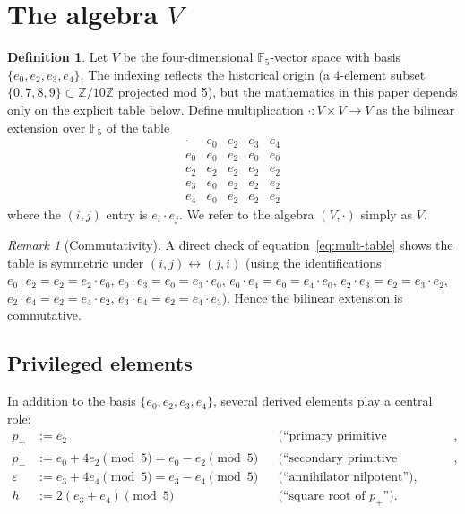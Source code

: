 \documentclass[11pt,reqno]{amsart}
\theoremstyle{plain}
\theoremstyle{definition}
\newtheorem{definition}[theorem]{Definition}
\theoremstyle{remark}
\newtheorem*{remark}{Remark}
\newcommand{\Z}{\mathbb{Z}}
\newcommand{\F}{\mathbb{F}}
\begin{document}
\section{The algebra $V$}
\label{sec:V}

\begin{definition}\label{def:V}
Let $V$ be the four-dimensional $\F_5$-vector space with basis $\{e_0, e_2, e_3, e_4\}$. The indexing reflects the historical origin (a 4-element subset $\{0, 7, 8, 9\} \subset \Z/10\Z$ projected mod 5), but the mathematics in this paper depends only on the explicit table below. Define multiplication $\cdot: V \times V \to V$ as the bilinear extension over $\F_5$ of the table
\begin{equation}\label{eq:mult-table}
\begin{array}{c|cccc}
\cdot & e_0 & e_2 & e_3 & e_4 \\ \hline
e_0 & e_0 & e_2 & e_0 & e_0 \\
e_2 & e_2 & e_2 & e_2 & e_2 \\
e_3 & e_0 & e_2 & e_2 & e_2 \\
e_4 & e_0 & e_2 & e_2 & e_2
\end{array}
\end{equation}
where the $(i, j)$ entry is $e_i \cdot e_j$. We refer to the algebra $(V, \cdot)$ simply as $V$.
\end{definition}

\begin{remark}[Commutativity]
A direct check of equation~\eqref{eq:mult-table} shows the table is symmetric under $(i, j) \leftrightarrow (j, i)$ (using the identifications $e_0 \cdot e_2 = e_2 = e_2 \cdot e_0$, $e_0 \cdot e_3 = e_0 = e_3 \cdot e_0$, $e_0 \cdot e_4 = e_0 = e_4 \cdot e_0$, $e_2 \cdot e_3 = e_2 = e_3 \cdot e_2$, $e_2 \cdot e_4 = e_2 = e_4 \cdot e_2$, $e_3 \cdot e_4 = e_2 = e_4 \cdot e_3$). Hence the bilinear extension is commutative.
\end{remark}

\subsection{Privileged elements}

In addition to the basis $\{e_0, e_2, e_3, e_4\}$, several derived elements play a central role:
\begin{align*}
p_+ &:= e_2 && \text{(``primary primitive idempotent'')},\\
p_- &:= e_0 + 4 e_2 \pmod 5 = e_0 - e_2 \pmod 5 && \text{(``secondary primitive idempotent'')},\\
\varepsilon &:= e_3 + 4 e_4 \pmod 5 = e_3 - e_4 \pmod 5 && \text{(``annihilator nilpotent'')},\\
h &:= 2(e_3 + e_4) \pmod 5 && \text{(``square root of } p_+ \text{'')}.
\end{align*}
\end{document}
